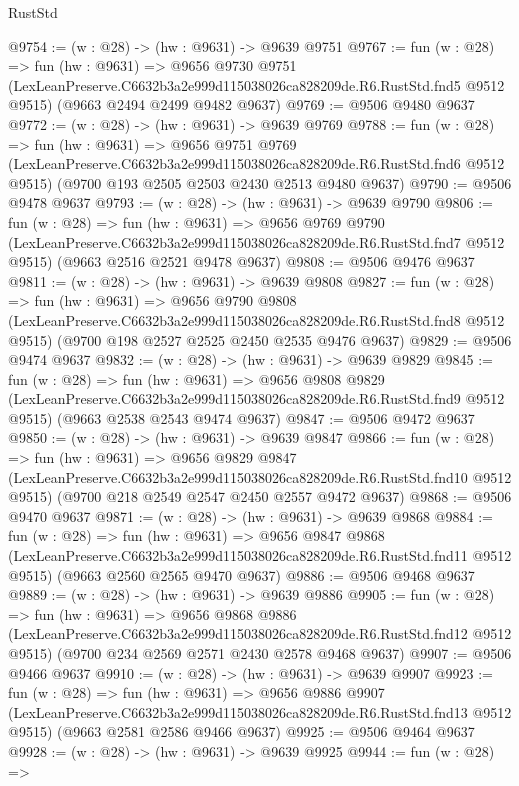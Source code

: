 \begin{lexlean}{RustStd}
\begin{coremodule}
@9754 := (w : @28) -> (hw : @9631) -> @9639 @9751
@9767 := fun (w : @28) =>
  fun (hw : @9631) =>
  @9656
    @9730
    @9751
    (LexLeanPreserve.C6632b3a2e999d115038026ca828209de.R6.RustStd.fnd5 @9512 @9515)
    (@9663 @2494 @2499 @9482 @9637)
@9769 := @9506 @9480 @9637
@9772 := (w : @28) -> (hw : @9631) -> @9639 @9769
@9788 := fun (w : @28) =>
  fun (hw : @9631) =>
  @9656
    @9751
    @9769
    (LexLeanPreserve.C6632b3a2e999d115038026ca828209de.R6.RustStd.fnd6 @9512 @9515)
    (@9700 @193 @2505 @2503 @2430 @2513 @9480 @9637)
@9790 := @9506 @9478 @9637
@9793 := (w : @28) -> (hw : @9631) -> @9639 @9790
@9806 := fun (w : @28) =>
  fun (hw : @9631) =>
  @9656
    @9769
    @9790
    (LexLeanPreserve.C6632b3a2e999d115038026ca828209de.R6.RustStd.fnd7 @9512 @9515)
    (@9663 @2516 @2521 @9478 @9637)
@9808 := @9506 @9476 @9637
@9811 := (w : @28) -> (hw : @9631) -> @9639 @9808
@9827 := fun (w : @28) =>
  fun (hw : @9631) =>
  @9656
    @9790
    @9808
    (LexLeanPreserve.C6632b3a2e999d115038026ca828209de.R6.RustStd.fnd8 @9512 @9515)
    (@9700 @198 @2527 @2525 @2450 @2535 @9476 @9637)
@9829 := @9506 @9474 @9637
@9832 := (w : @28) -> (hw : @9631) -> @9639 @9829
@9845 := fun (w : @28) =>
  fun (hw : @9631) =>
  @9656
    @9808
    @9829
    (LexLeanPreserve.C6632b3a2e999d115038026ca828209de.R6.RustStd.fnd9 @9512 @9515)
    (@9663 @2538 @2543 @9474 @9637)
@9847 := @9506 @9472 @9637
@9850 := (w : @28) -> (hw : @9631) -> @9639 @9847
@9866 := fun (w : @28) =>
  fun (hw : @9631) =>
  @9656
    @9829
    @9847
    (LexLeanPreserve.C6632b3a2e999d115038026ca828209de.R6.RustStd.fnd10 @9512 @9515)
    (@9700 @218 @2549 @2547 @2450 @2557 @9472 @9637)
@9868 := @9506 @9470 @9637
@9871 := (w : @28) -> (hw : @9631) -> @9639 @9868
@9884 := fun (w : @28) =>
  fun (hw : @9631) =>
  @9656
    @9847
    @9868
    (LexLeanPreserve.C6632b3a2e999d115038026ca828209de.R6.RustStd.fnd11 @9512 @9515)
    (@9663 @2560 @2565 @9470 @9637)
@9886 := @9506 @9468 @9637
@9889 := (w : @28) -> (hw : @9631) -> @9639 @9886
@9905 := fun (w : @28) =>
  fun (hw : @9631) =>
  @9656
    @9868
    @9886
    (LexLeanPreserve.C6632b3a2e999d115038026ca828209de.R6.RustStd.fnd12 @9512 @9515)
    (@9700 @234 @2569 @2571 @2430 @2578 @9468 @9637)
@9907 := @9506 @9466 @9637
@9910 := (w : @28) -> (hw : @9631) -> @9639 @9907
@9923 := fun (w : @28) =>
  fun (hw : @9631) =>
  @9656
    @9886
    @9907
    (LexLeanPreserve.C6632b3a2e999d115038026ca828209de.R6.RustStd.fnd13 @9512 @9515)
    (@9663 @2581 @2586 @9466 @9637)
@9925 := @9506 @9464 @9637
@9928 := (w : @28) -> (hw : @9631) -> @9639 @9925
@9944 := fun (w : @28) =>

\end{coremodule}
\end{lexlean}
